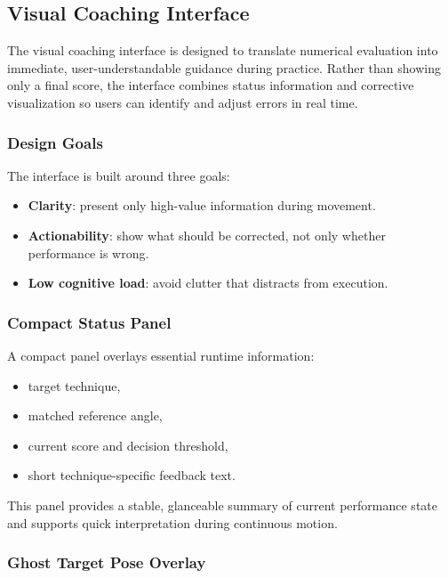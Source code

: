 \documentclass[12pt]{article}
\begin{document}
{\subsection{Visual Coaching Interface}

The visual coaching interface is designed to translate numerical evaluation into immediate, user-understandable guidance during practice. Rather than showing only a final score, the interface combines status information and corrective visualization so users can identify and adjust errors in real time.

\subsubsection{Design Goals}

The interface is built around three goals:

\begin{itemize}
    \item \textbf{Clarity}: present only high-value information during movement.
    \item \textbf{Actionability}: show what should be corrected, not only whether performance is wrong.
    \item \textbf{Low cognitive load}: avoid clutter that distracts from execution.
\end{itemize}

\subsubsection{Compact Status Panel}

A compact panel overlays essential runtime information:

\begin{itemize}
    \item target technique,
    \item matched reference angle,
    \item current score and decision threshold,
    \item short technique-specific feedback text.
\end{itemize}

This panel provides a stable, glanceable summary of current performance state and supports quick interpretation during continuous motion.

\subsubsection{Ghost Target Pose Overlay}

}
\end{document}
